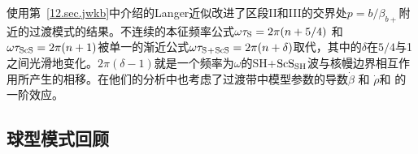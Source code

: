 \textcite{kennett&nolet79}使用第~\ref{12.sec.jwkb}中介绍的Langer近似改进了区段II和III的交界处$p\!=\!b/\beta_{b+}$附近的过渡模式的结果。不连续的本征频率公式$\omega\tau_{\rm S}=2\pi(n+5/4)$
和 $\omega\tau_{\rm ScS}=2\pi(n+1)$被单一的渐近公式$\omega\tau_{\rm S\hspace{0.2 mm}+\hspace{0.2 mm}ScS}=2\pi(n+\delta)$取代，其中的$\delta$在$5/4$与1之间光滑地变化。$2\pi(\delta-1)$就是一个频率为$\omega$的SH\hspace{0.3 mm}+\hspace{0.3 mm}${\rm ScS}_{\rm SH}$波与核幔边界相互作用所产生的相移。在他们的分析中也考虑了过渡带中模型参数的导数$\dot{\beta}$ 和 $\dot{\rho}$和  的一阶效应。
%

\subsection{球型模式回顾}
%
\label{12.sec.sphasy}


